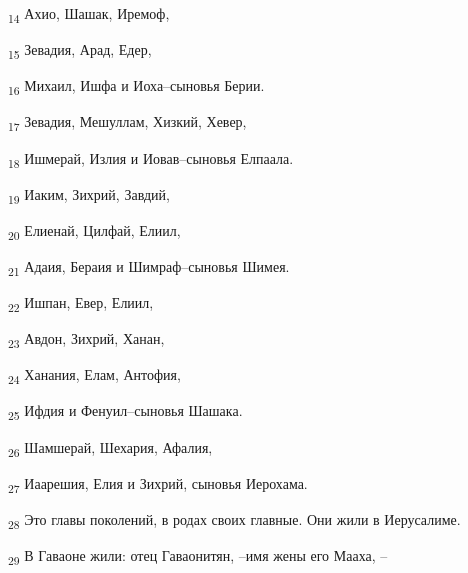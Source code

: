 \begin{tcolorbox}
\textsubscript{14} Ахио, Шашак, Иремоф,
\end{tcolorbox}
\begin{tcolorbox}
\textsubscript{15} Зевадия, Арад, Едер,
\end{tcolorbox}
\begin{tcolorbox}
\textsubscript{16} Михаил, Ишфа и Иоха--сыновья Берии.
\end{tcolorbox}
\begin{tcolorbox}
\textsubscript{17} Зевадия, Мешуллам, Хизкий, Хевер,
\end{tcolorbox}
\begin{tcolorbox}
\textsubscript{18} Ишмерай, Излия и Иовав--сыновья Елпаала.
\end{tcolorbox}
\begin{tcolorbox}
\textsubscript{19} Иаким, Зихрий, Завдий,
\end{tcolorbox}
\begin{tcolorbox}
\textsubscript{20} Елиенай, Цилфай, Елиил,
\end{tcolorbox}
\begin{tcolorbox}
\textsubscript{21} Адаия, Бераия и Шимраф--сыновья Шимея.
\end{tcolorbox}
\begin{tcolorbox}
\textsubscript{22} Ишпан, Евер, Елиил,
\end{tcolorbox}
\begin{tcolorbox}
\textsubscript{23} Авдон, Зихрий, Ханан,
\end{tcolorbox}
\begin{tcolorbox}
\textsubscript{24} Ханания, Елам, Антофия,
\end{tcolorbox}
\begin{tcolorbox}
\textsubscript{25} Ифдия и Фенуил--сыновья Шашака.
\end{tcolorbox}
\begin{tcolorbox}
\textsubscript{26} Шамшерай, Шехария, Афалия,
\end{tcolorbox}
\begin{tcolorbox}
\textsubscript{27} Иаарешия, Елия и Зихрий, сыновья Иерохама.
\end{tcolorbox}
\begin{tcolorbox}
\textsubscript{28} Это главы поколений, в родах своих главные. Они жили в Иерусалиме.
\end{tcolorbox}
\begin{tcolorbox}
\textsubscript{29} В Гаваоне жили: отец Гаваонитян, --имя жены его Мааха, --
\end{tcolorbox}
